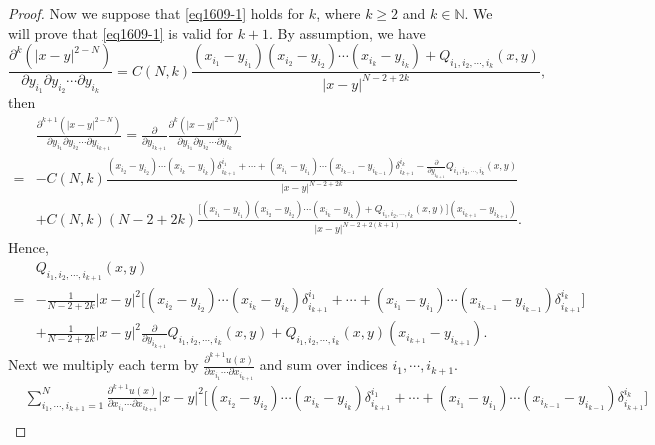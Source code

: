 \documentclass[11pt,reqno]{article}
\numberwithin{equation}{section}
\newcommand\N{\mathbb N}
\begin{document}
\begin{proof}
                Now we suppose that \eqref{eq1609-1} holds for $k$, where $k\geq 2$ and $k\in \N$. We will prove that \eqref{eq1609-1} is valid for $k+1$.
				By assumption, we have
				\begin{equation*}
					\frac{\partial^k\left(|x-y|^{2-N}\right)}{\partial y_{i_1} \partial y_{i_2}\cdots \partial y_{i_k}}=C(N,k)\frac{(x_{i_1}-y_{i_1})(x_{i_2}-y_{i_2})\cdots (x_{i_k}-y_{i_k})+Q_{i_1,i_2,\cdots,i_k}(x,y)}
					{|x-y|^{N-2+2k}},
				\end{equation*}
				then 
				\begin{align*}
					&\frac{\partial^{k+1}\left(|x-y|^{2-N}\right)}{\partial y_{i_1} \partial y_{i_2}\cdots \partial y_{i_{k+1}}}=\frac{\partial}{\partial y_{i_{k+1}}}\frac{\partial^k\left(|x-y|^{2-N}\right)}{\partial y_{i_1} \partial y_{i_2}\cdots \partial y_{i_k}}\\
					=&-C(N,k)\frac{(x_{i_2}-y_{i_2})\cdots (x_{i_k}-y_{i_k})\delta_{i_{k+1}}^{i_1}+\cdots+(x_{i_1}-y_{i_1})\cdots (x_{i_{k-1}}-y_{i_{k-1}})\delta_{i_{k+1}}^{i_k}-\frac{\partial}{\partial y_{i_{k+1}}}Q_{i_1,i_2,\cdots,i_k}(x,y)}
					{|x-y|^{N-2+2k}}\\
					&+C(N,k)(N-2+2k)\frac{\Big[(x_{i_1}-y_{i_1})(x_{i_2}-y_{i_2})\cdots (x_{i_k}-y_{i_k})+Q_{i_1,i_2,\cdots,i_k}(x,y)\Big](x_{i_{k+1}}-y_{i_{k+1}})}
					{|x-y|^{N-2+2(k+1)}}.
				\end{align*}
				Hence, 
				\begin{equation}\label{eq1709-5}
					\begin{aligned}
						&Q_{i_1,i_2,\cdots,i_{k+1}}(x,y)\\
						=&-\frac{1}{N-2+2k}|x-y|^2\Big[(x_{i_2}-y_{i_2})\cdots (x_{i_k}-y_{i_k})\delta_{i_{k+1}}^{i_1}+\cdots+(x_{i_1}-y_{i_1})\cdots (x_{i_{k-1}}-y_{i_{k-1}})\delta_{i_{k+1}}^{i_k}\Big]\\
						&+\frac{1}{N-2+2k}|x-y|^2\frac{\partial}{\partial y_{i_{k+1}}}Q_{i_1,i_2,\cdots,i_k}(x,y)+Q_{i_1,i_2,\cdots,i_k}(x,y)(x_{i_{k+1}}-y_{i_{k+1}}).
					\end{aligned}
				\end{equation}
				Next we multiply each term by $\frac{\partial^{k+1} u(x)}{\partial x_{i_1} \cdots \partial x_{i_{k+1}}}$ and sum over indices $i_1,\cdots,i_{k+1}$.
				\begin{equation}\label{eq1709-4}
					\begin{aligned}
						&\sum_{i_1,\cdots,i_{k+1}=1}^{N}\frac{\partial^{k+1} u(x)}{\partial x_{i_1} \cdots \partial x_{i_{k+1}}}|x-y|^2\Big[(x_{i_2}-y_{i_2})\cdots (x_{i_k}-y_{i_k})\delta_{i_{k+1}}^{i_1}+\cdots+(x_{i_1}-y_{i_1})\cdots (x_{i_{k-1}}-y_{i_{k-1}})\delta_{i_{k+1}}^{i_k}\Big]\\

\end{aligned}
\end{equation}
\end{proof}
\end{document}
